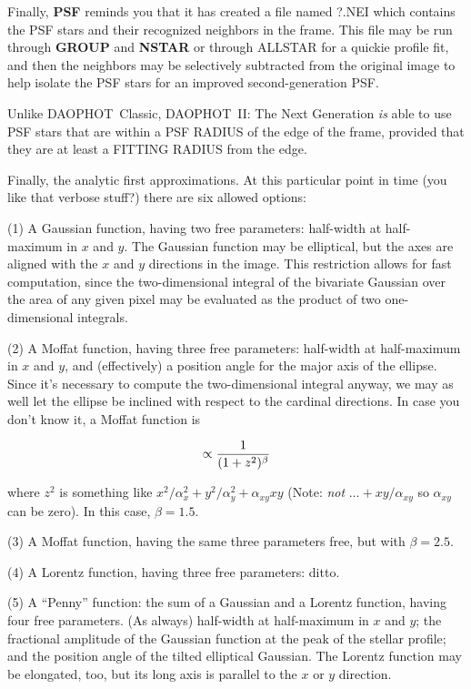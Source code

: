 Finally, {\bf PSF} reminds you that it has created a file named
?.NEI which contains the PSF stars and their recognized neighbors
in the frame.  This file may be run through {\bf GROUP} and
{\bf NSTAR} or through ALLSTAR for a quickie profile fit, and
then the neighbors may be selectively subtracted from the original
image to help isolate the PSF stars for an improved second-generation
PSF.

Unlike DAOPHOT~Classic, DAOPHOT~II: The Next Generation {\it is\/}
able to use PSF stars that are within a PSF RADIUS of the edge of
the frame, provided that they are at least a FITTING RADIUS from 
the edge.  

Finally, the analytic first approximations.  At this particular point
in time (you like that verbose stuff?) there are six allowed options:

\item{(1)} A Gaussian function, having two free parameters:  half-width
at half-maximum in $x$ and $y$.  The Gaussian function may be elliptical,
but the axes are aligned with the $x$ and $y$ directions in the image.
This restriction allows for fast computation, since the two-dimensional
integral of the bivariate Gaussian over the area of any given pixel
may be evaluated as the product of two one-dimensional integrals.

\item{(2)} A Moffat function, having three free parameters: half-width
at half-maximum in $x$ and $y$, and (effectively) a position angle for
the major axis of the ellipse.  Since it's necessary to compute the
two-dimensional integral anyway, we may as well let the ellipse be
inclined with respect to the cardinal directions.  In case you don't
know it, a Moffat function is

$$ \propto{1\over{(1 + z^2)^\beta}}$$

\item{} where $z^2$ is something like ${x^2/\alpha_x^2} +
{y^2/\alpha_y^2} + {\alpha_{xy} x y}$ (Note: {\it not\/} $\ldots +
{xy/\alpha_{xy}}$ so $\alpha_{xy}$ can be zero).  In this case, $\beta
= 1.5$.

\item{(3)} A Moffat function, having the same three parameters free,
but with $\beta = 2.5$.

\item{(4)} A Lorentz function, having three free parameters:  ditto.

\item{(5)}  A ``Penny'' function: the sum of a Gaussian and a Lorentz
function, having four free parameters.  (As always) half-width at
half-maximum in $x$ and $y$; the fractional amplitude of the
Gaussian function at the peak of the stellar profile; and the position
angle of the tilted elliptical Gaussian.  The Lorentz function may
be elongated, too, but its long axis is parallel to the $x$ or
$y$ direction.

